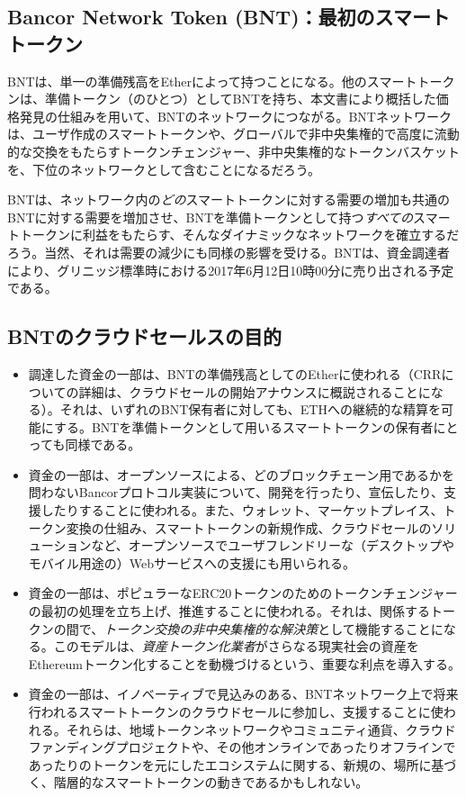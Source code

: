 \documentclass{jsarticle}
\begin{document}
  \subsection{Bancor Network Token (BNT)：最初のスマートトークン}

  BNTは、単一の準備残高をEtherによって持つことになる。他のスマートトークンは、準備トークン（のひとつ）としてBNTを持ち、本文書により概括した価格発見の仕組みを用いて、BNTのネットワークにつながる。BNTネットワークは、ユーザ作成のスマートトークンや、グローバルで非中央集権的で高度に流動的な交換をもたらすトークンチェンジャー、非中央集権的なトークンバスケットを、下位のネットワークとして含むことになるだろう。

  BNTは、ネットワーク内の\emph{どの}スマートトークンに対する需要の増加も共通のBNTに対する需要を増加させ、BNTを準備トークンとして持つ\emph{すべての}スマートトークンに利益をもたらす、そんなダイナミックなネットワークを確立するだろう。当然、それは需要の減少にも同様の影響を受ける。BNTは、資金調達者により、グリニッジ標準時における2017年6月12日10時00分に売り出される予定である。

  \subsection{BNTのクラウドセールスの目的}

  \begin{itemize}
    \item 調達した資金の一部は、BNTの準備残高としてのEtherに使われる（CRRについての詳細は、クラウドセールの開始アナウンスに概説されることになる）。それは、いずれのBNT保有者に対しても、ETHへの継続的な精算を可能にする。BNTを準備トークンとして用いるスマートトークンの保有者にとっても同様である。
    \item 資金の一部は、オープンソースによる、どのブロックチェーン用であるかを問わないBancorプロトコル実装について、開発を行ったり、宣伝したり、支援したりすることに使われる。また、ウォレット、マーケットプレイス、トークン変換の仕組み、スマートトークンの新規作成、クラウドセールのソリューションなど、オープンソースでユーザフレンドリーな（デスクトップやモバイル用途の）Webサービスへの支援にも用いられる。
    \item 資金の一部は、ポピュラーなERC20トークンのためのトークンチェンジャーの最初の処理を立ち上げ、推進することに使われる。それは、関係するトークンの間で、\emph{トークン交換の非中央集権的な解決策}として機能することになる。このモデルは、\emph{資産トークン化業者}がさらなる現実社会の資産をEthereumトークン化することを動機づけるという、重要な利点を導入する。
    \item 資金の一部は、イノベーティブで見込みのある、BNTネットワーク上で将来行われるスマートトークンのクラウドセールに参加し、支援することに使われる。それらは、地域トークンネットワークやコミュニティ通貨、クラウドファンディングプロジェクトや、その他オンラインであったりオフラインであったりのトークンを元にしたエコシステムに関する、新規の、場所に基づく、階層的なスマートトークンの動きであるかもしれない。
  \end{itemize}
\end{document}

